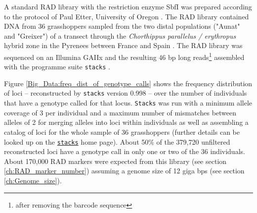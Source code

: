 \documentclass[a4paper,12pt,times,print,index,custombib,custommargin]{PhDThesisPSnPDF}\usepackage[]{graphicx}\usepackage[]{color}
\begin{document}
A standard RAD library with the restriction enzyme \gls{SbfI} was prepared according to the protocol of Paul Etter, University of Oregon \citep{Baird2008}. The RAD library contained DNA from 36 grasshoppers sampled from the two distal populations ("Aunat" and "Greixer") of a transect through the \textit{Chorthippus parallelus / erythropus} hybrid zone in the Pyrenees between France and Spain \citep{Hewitt1987}. The RAD library was sequenced on an Illumina GAIIx and the resulting 46 \gls{bp}  long reads\footnote{after removing the barcode sequence} assembled with the programme suite \texttt{stacks} \citep{Catchen2011}.

Figure \ref{Big_Data:freq_dist_of_genotype_calls} shows the frequency distribution of loci -- reconstructed by \texttt{stacks} version 0.998  -- over the number of individuals that have a genotype called for that locus. \texttt{Stacks} was run with a minimum allele coverage of 3 per individual and a maximum number of mismatches between alleles of 2 for merging alleles into loci within individuals as well as assembling a catalog of loci for the whole sample of 36 grasshoppers (further details can be looked up on the \href{http://creskolab.uoregon.edu/stacks/param_tut.php}{\texttt{stacks}} home page). About 50\% of the 379,720 unfiltered reconstructed loci have a genotype call in only one or two of the 36 individuals. About 170,000 RAD markers were expected from this library (see section \ref{ch:RAD_marker_number}) assuming a genome size of 12 giga \glspl{bp} (see section \ref{ch:Genome_size}).

\end{document}
